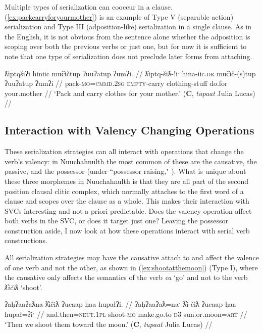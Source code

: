 Multiple types of serialization can cooccur in a clause. (\ref{ex:packcarryforyourmother}) is an example of Type V (separable action) serialization and Type III (adposition-like) serialization in a single clause. As in the English, it is not obvious from the sentence alone whether the adposition is scoping over both the previous verbs or just one, but for now it is sufficient to note that one type of serialization does not preclude later forms from attaching.

\ex \label{ex:packcarryforyourmother}
\begingl
\glpreamble ƛ̓iptqšiʔi hiniic muč̓ičtup ʔuuʔatup ʔumʔi. //
\gla ƛ̓iptq-šiƛ-!iˑ hina-iic.\textsc{dr} muč̓ič-(s)tup ʔuuʔatup ʔumʔi //
\glb pack-\textsc{mo}=\textsc{cmmd.2sg} \textsc{empty}-carry clothing-stuff do.for your.mother //
\glft `Pack and carry clothes for your mother.' (\textbf{C}, \textit{tupaat} Julia Lucas) //
\endgl
\xe

\subsection{Interaction with Valency Changing Operations} \label{ch:sv:valence}

These serialization strategies can all interact with operations that change the verb's valency: in Nuuchahnulth the most common of these are the causative, the passive, and the possessor (under ``possessor raising," \citealt{braithwaite2003}). What is unique about these three morphemes in Nuuchahnulth is that they are all part of the second position clausal clitic complex, which normally attaches to the first word of a clause and scopes over the clause as a whole. This makes their interaction with SVCs interesting and not a priori predictable. Does the valency operation affect both verbs in the SVC, or does it target just one? Leaving the possessor construction aside, I now look at how these operations interact with serial verb constructions.

All serialization strategies may have the causative attach to and affect the valence of one verb and not the other, as shown in (\ref{ex:shootatthemoon}) (Type I), where the causative only affects the semantics of the verb \textit{ca} `go' and not to the verb \textit{ƛ̓ičiƛ} `shoot'.

\ex \label{ex:shootatthemoon}
\begingl
\glpreamble ʔaḥʔaaʔaƛna ƛ̓ičiƛ ʔucaap ḥaa hupałʔi. //
\gla ʔaḥʔaaʔaƛ=naˑ ƛ̓i-čiƛ ʔucaap ḥaa hupał=ʔiˑ //
\glb and.then=\textsc{neut.1pl} shoot-\textsc{mo} make.go.to \textsc{d3} sun.or.moon=\textsc{art} //
\glft `Then we shoot them toward the moon.' (\textbf{C}, \textit{tupaat} Julia Lucas) //
\endgl
\xe

